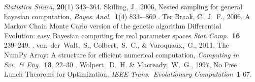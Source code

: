 \documentclass[modern]{aastex61}
\begin{document}
\begin{thebibliography}{}
  \textit{Statistica Sinica}, \textbf{20}(1) 343--364.
  Skilling, J., 2006,
  Nested sampling for general bayesian computation,
  \textit{Bayes.\,Anal.}\ \textbf{1}(4) 833-–860
  .
  Ter Braak, C.~J.~F., 2006,
  A Markov Chain Monte Carlo version of the genetic algorithm
  Differential Evolution: easy Bayesian computing for real
  parameter spaces
  \textit{Stat.\,Comp.}\ \textbf{16} 239--249.
  .
  van~der~Walt,~S., Colbert,~S.~C., \& Varoquaux,~G., 2011,
  The NumPy Array: A structure for efficient numerical computation,
  \textit{Computing in Sci.\ \& Eng.}\ \textbf{13}, 22--30
  .
  Wolpert,~D.~H. \& Macready,~W.~G., 1997,
  No Free Lunch Theorems for Optimization,
  \textit{IEEE Trans.\ Evolutionary Computation}\ \textbf{1} 67.
\end{thebibliography}
\end{document}
